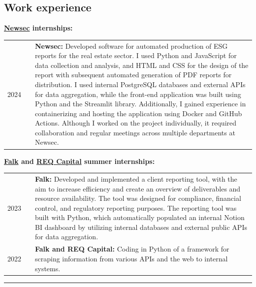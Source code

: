 \documentclass[10pt]{article}
\newlength{\cw}
\newlength{\cwl}
\begin{document}
\subsection*{Work experience}
 
\textbf{\href{https://www.newsec.no/}{Newsec} internships:}

\begin{tabular}{p{\cw} @{:}l p{\cwl}}
  2024 & & \textbf{Newsec:} Developed software for automated production of ESG reports for the real estate sector. I used Python and JavaScript for data collection and analysis, and HTML and CSS for the design of the report with subsequent automated generation of PDF reports for distribution. I used internal PostgreSQL databases and external APIs for data aggregation, while the front-end application was built using Python and the Streamlit library. Additionally, I gained experience in containerizing and hosting the application using Docker and GitHub Actions.  Although I worked on the project individually, it required collaboration and regular meetings across multiple departments at Newsec.
\end{tabular}

\textbf{\href{https://www.falkglobal.no/}{Falk} and \href{https://req.no/}{REQ Capital} summer internships:}

\begin{tabular}{p{\cw} @{:}l p{\cwl}}
  2023 & & \textbf{Falk:} Developed and implemented a client reporting tool, with the aim to increase efficiency and create an overview of deliverables and resource availability. The tool was designed for compliance, financial control, and regulatory reporting purposes. The reporting tool was built with Python, which automatically populated an internal Notion BI dashboard by utilizing internal databases and external public APIs for data aggregation.\\
  
  2022 & & \textbf{Falk and REQ Capital:} Coding in Python of a framework for scraping information from various APIs and the web to internal systems.
\end{tabular}

\vspace{0.1cm}
\hrule
\vspace{0.1cm}
\end{document}
